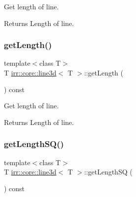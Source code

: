 Get length of line. 

\begin{DoxyReturn}{Returns}
Length of line. 
\end{DoxyReturn}
\mbox{\label{classirr_1_1core_1_1line3d_aa6bf257a8b227c4f5d974ee76607a700}} 
\subsubsection{\texorpdfstring{get\+Length()}{getLength()}\hspace{0.1cm}{\footnotesize\ttfamily [2/2]}}
{\footnotesize\ttfamily template$<$class T$>$ \\
T \hyperlink{classirr_1_1core_1_1line3d}{irr\+::core\+::line3d}$<$ T $>$\+::get\+Length (\begin{DoxyParamCaption}{ }\end{DoxyParamCaption}) const\hspace{0.3cm}{\ttfamily [inline]}}



Get length of line. 

\begin{DoxyReturn}{Returns}
Length of line. 
\end{DoxyReturn}
\mbox{\label{classirr_1_1core_1_1line3d_a4754398992c5922efe33cad0bf773ddc}} 
\subsubsection{\texorpdfstring{get\+Length\+S\+Q()}{getLengthSQ()}\hspace{0.1cm}{\footnotesize\ttfamily [1/2]}}
{\footnotesize\ttfamily template$<$class T$>$ \\
T \hyperlink{classirr_1_1core_1_1line3d}{irr\+::core\+::line3d}$<$ T $>$\+::get\+Length\+SQ (\begin{DoxyParamCaption}{ }\end{DoxyParamCaption}) const\hspace{0.3cm}{\ttfamily [inline]}}



